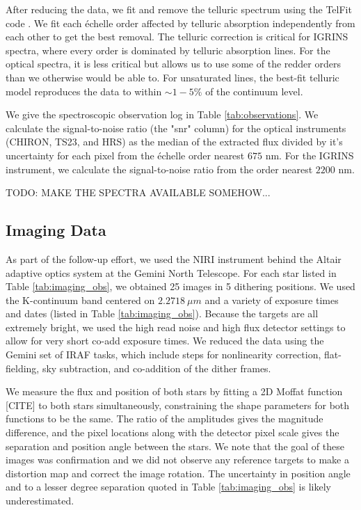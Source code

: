 \documentclass{emulateapj}
\begin{document}
After reducing the data, we fit and remove the telluric spectrum using the TelFit code \citep{Gullikson2014}. We fit each \'echelle order affected by telluric absorption independently from each other to get the best removal. The telluric correction is critical for IGRINS spectra, where every order is dominated by telluric absorption lines. For the optical spectra, it is less critical but allows us to use some of the redder orders than we otherwise would be able to. For unsaturated lines, the best-fit telluric model reproduces the data to within $\sim 1-5\%$ of the continuum level.

We give the spectroscopic observation log in Table \ref{tab:observations}. We calculate the signal-to-noise ratio (the "snr" column) for the optical instruments (CHIRON, TS23, and HRS) as the median of the extracted flux divided by it's uncertainty for each pixel from the \'echelle order nearest $675$ nm. For the IGRINS instrument, we calculate the signal-to-noise ratio from the order nearest $2200$ nm.


TODO: MAKE THE SPECTRA AVAILABLE SOMEHOW...


\subsection{Imaging Data}
As part of the follow-up effort, we used the NIRI instrument behind the Altair adaptive optics system at the Gemini North Telescope. For each star listed in Table \ref{tab:imaging_obs}, we obtained 25 images in 5 dithering positions. We used the K-continuum band centered on $2.2718\ \mu m$ and a variety of exposure times and dates (listed in Table \ref{tab:imaging_obs}). Because the targets are all extremely bright, we used the high read noise and high flux detector settings to allow for very short co-add exposure times. We reduced the data using the Gemini set of IRAF tasks, which include steps for nonlinearity correction, flat-fielding, sky subtraction, and co-addition of the dither frames. 

We measure the flux and position of both stars by fitting a 2D Moffat function [CITE] to both stars simultaneously, constraining the shape parameters for both functions to be the same. The ratio of the amplitudes gives the magnitude difference, and the pixel locations along with the detector pixel scale gives the separation and position angle between the stars. We note that the goal of these images was confirmation and we did not observe any reference targets to make a distortion map and correct the image rotation. The uncertainty in position angle and to a lesser degree separation quoted in Table \ref{tab:imaging_obs} is likely underestimated.
\end{document}
